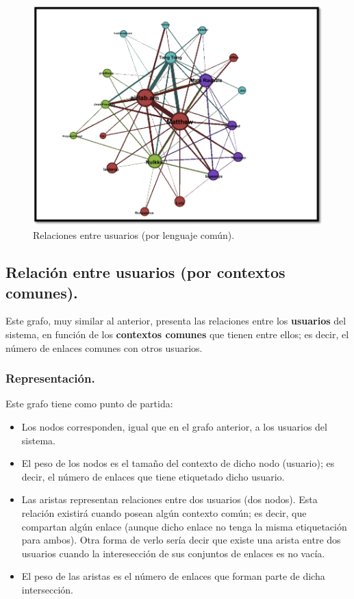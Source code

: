 \begin{figure}
\centering
\includegraphics[scale=0.7]{img/7/grafo33}
\caption{Relaciones entre usuarios (por lenguaje común).
\label{fig:grafo33}}
\end{figure}








\subsection{Relación entre usuarios (por contextos comunes).}

Este grafo, muy similar al anterior, presenta las relaciones entre los {\bf usuarios} del sistema, en función de los {\bf contextos comunes} que tienen entre ellos; es decir, el número de enlaces comunes con otros usuarios.

\subsubsection{Representación.}

Este grafo tiene como punto de partida:

\begin{itemize}
\item    Los nodos corresponden, igual que en el grafo anterior, a los usuarios del sistema.
\item    El peso de los nodos es el tamaño del contexto de dicho nodo (usuario); es decir, el número de enlaces que tiene etiquetado dicho usuario.
\item    Las aristas representan relaciones entre dos usuarios (dos nodos). Esta relación existirá cuando posean algún contexto común; es decir, que compartan algún enlace (aunque dicho enlace no tenga la misma etiquetación para ambos). Otra forma de verlo sería decir que existe una arista entre dos usuarios cuando la interesección de sus conjuntos de enlaces es no vacía.
\item    El peso de las aristas es el número de enlaces que forman parte de dicha intersección.
\end{itemize}

